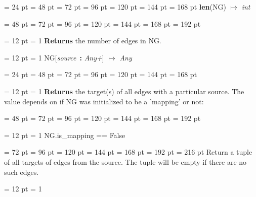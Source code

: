 {{\par \noindent  \leftskip = 24 pt  \leftmargini = 48 pt  \leftmarginii = 72 pt  \leftmarginiii = 96 pt  \leftmarginiv = 120 pt  \leftmarginv = 144 pt  \leftmarginvi = 168 pt {\large {\bf len\/}}(NG) \(\mapsto \)  {\em int\/}{\par \noindent
{\par \noindent  \leftskip = 48 pt  \leftmargini = 72 pt  \leftmarginii = 96 pt  \leftmarginiii = 120 pt  \leftmarginiv = 144 pt  \leftmarginv = 168 pt  \leftmarginvi = 192 pt {\par \noindent
{\par \pagebreak[3.100000] \noindent \hangindent = 12 pt \hangafter = 1 
{\bf Returns \/} the number of edges in NG.
\par}
\par}
\par}
\par}
\par}
{\par \pagebreak[3.300000] \noindent \hangindent = 12 pt \hangafter = 1 
NG{[}{\em source\/}~{\bf :}  {\em Any+\/}] \(\mapsto \)  {\em Any\/}\par}
{\par \noindent  \leftskip = 24 pt  \leftmargini = 48 pt  \leftmarginii = 72 pt  \leftmarginiii = 96 pt  \leftmarginiv = 120 pt  \leftmarginv = 144 pt  \leftmarginvi = 168 pt {\par \noindent
{\par \pagebreak[3.200000] \noindent \hangindent = 12 pt \hangafter = 1 
{\bf Returns \/} the target(s) of all edges with a particular source. The value
depends on if NG was initialized to be a 'mapping' or not:{\par \noindent  \leftskip = 48 pt  \leftmargini = 72 pt  \leftmarginii = 96 pt  \leftmarginiii = 120 pt  \leftmarginiv = 144 pt  \leftmarginv = 168 pt  \leftmarginvi = 192 pt {\par \pagebreak[3.000000] \noindent \hangindent = 12 pt \hangafter = 1 
 NG.is{\_}mapping == False\par}
{\par \noindent  \leftskip = 72 pt  \leftmargini = 96 pt  \leftmarginii = 120 pt  \leftmarginiii = 144 pt  \leftmarginiv = 168 pt  \leftmarginv = 192 pt  \leftmarginvi = 216 pt  Return a tuple of all targets of edges from the source.
          The tuple will be empty if there are no such edges.\par}
{\par \pagebreak[3.000000] \noindent \hangindent = 12 pt \hangafter = 1 
}}}}}}
